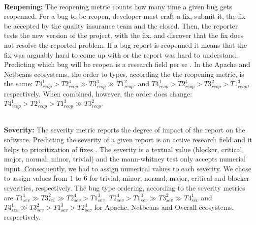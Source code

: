 \\ \vspace{0.1cm} {\bf Reopening: }
The reopening metric counts how many time a given bug gets reopenned.
For a bug to be reopen, developer must craft a fix, submit it, the fix be accepted by the quality insurance team and the closed.
Then, the reporter tests the new version of the project, with the fix, and discover that the fix does not resolve the reported problem.
If a bug report is reopenned it means that the fix was arguably hard to come up with or the report was hard to understand.
Predicting which bug will be reopen is a research field per se
\cite{Zimmermann2012}\cite{Shihab2010}\cite{Lo2013}.
In the Apache and Netbeans ecosystems, the order to types, according the the reopening metric, is the same:
$
T4_{reop}^1
 >
T2_{reop}^4
 \gg
T3_{reop}^3
 \gg
T1_{reop}^2
$.
and
$
T4_{reop}^1 >
T2_{reop}^4 >
T3_{reop}^2 >
T1_{reop}^3
$, respectively.
When combined, however, the order does change:
$
T4_{reop}^1
 >
T2_{reop}^4
 >
T1_{reop}^3
 \gg
T3_{reop}^2
$.

\\ \vspace{0.1cm} {\bf Severity: } The severity metric reports the degree of impact of the report on the software.
Predicting the severity of a given report is an active research field
\cite{Menzies2008,Guo2010,Lamkanfi2010,Tian2012,ValdiviaGarcia2014, Havelund2015} and it helps to prioritization of fixes \cite{Xuan2012}.
The severity is a textual value (blocker, critical, major, normal, minor, trivial) and the mann-whitney test only accepts numerial input.
Consequently, we had to assign numerical values to each severity.
We chose to assign values from 1 to 6 for trivial, minor, normal, major, critical and blocker severities, respectively.
The bug type ordering, according to the severity metrics are
$
T4_{sev}^1
 \gg
T3_{sev}^2
 \gg
T2_{sev}^4
 >
T1_{sev}^3
$,
$
T2_{sev}^4
>
T1_{sev}^3
 \gg
T3_{sev}^2
 \gg
T4_{sev}^1
$
and
$
T4_{sev}^1
 \gg
T3_{sev}^2
 >
T1_{sev}^3
 >
T2_{sev}^4
$
for Apache, Netbeans and Overall ecosystems, respectively.


